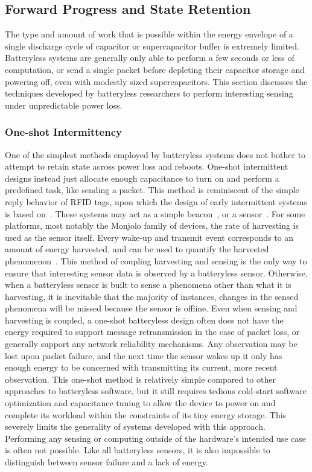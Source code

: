 \subsection{Forward Progress and State Retention}
The type and amount of work that is possible within the energy envelope of a single discharge cycle of capacitor or supercapacitor buffer is extremely limited.
Batteryless systems are generally only able to perform a few seconds or less of computation, or send a single packet before depleting their capacitor storage and powering off, even with modestly sized supercapacitors.
This section discusses the techniques developed by batteryless researchers to perform interesting sensing under unpredictable power loss. 

\subsubsection{One-shot Intermittency}
\label{cha:background:one-shot}
One of the simplest methods employed by batteryless systems does not bother to attempt to retain state across power loss and reboots.
One-shot intermittent designs instead just allocate enough capacitance to turn on and perform a predefined task, like sending a packet.
This method is reminiscent of the simple reply behavior of RFID tags, upon which the design of early intermittent systems is based on~\cite{sample2008design}.
These systems may act as a simple beacon~\cite{campbell2016cinamin,saoda2019no}, or a sensor~\cite{yervaGrafting12, debruin2013monjolo, campbellEnergy14, campbellThermes14}.
For some platforms, most notably the Monjolo family of devices, the rate of harvesting is used as the sensor itself. Every wake-up and transmit event corresponds to an amount of energy harvested, and can be used to quantify the harvested phenomenon~\cite{campbellThermes14, campbellEnergy14, debruin2013monjolo}.
This method of coupling harvesting and sensing is the only way to ensure that interesting sensor data is observed by a batteryless sensor.
Otherwise, when a batteryless sensor is built to sense a phenomena other than what it is harvesting, it is inevitable that the majority of instances, changes in the sensed phenomena will be missed because the sensor is offline.
Even when sensing and harvesting is coupled, a one-shot batteryless design often does not have the energy required to support message retransmission in the case of packet loss, or generally support any network reliability mechanisms.
Any observation may be lost upon packet failure, and the next time the sensor wakes up it only has enough energy to be concerned with transmitting its current, more recent observation.
This one-shot method is relatively simple compared to other approaches to batteryless software, but it still requires tedious cold-start software optimization and capacitance tuning to allow the device to power on and complete its workload within the constraints of its tiny energy storage.
This severely limits the generality of systems developed with this approach.
Performing any sensing or computing outside of the hardware's intended use case is often not possible.
Like all batteryless sensors, it is also impossible to distinguish between sensor failure and a lack of energy.

